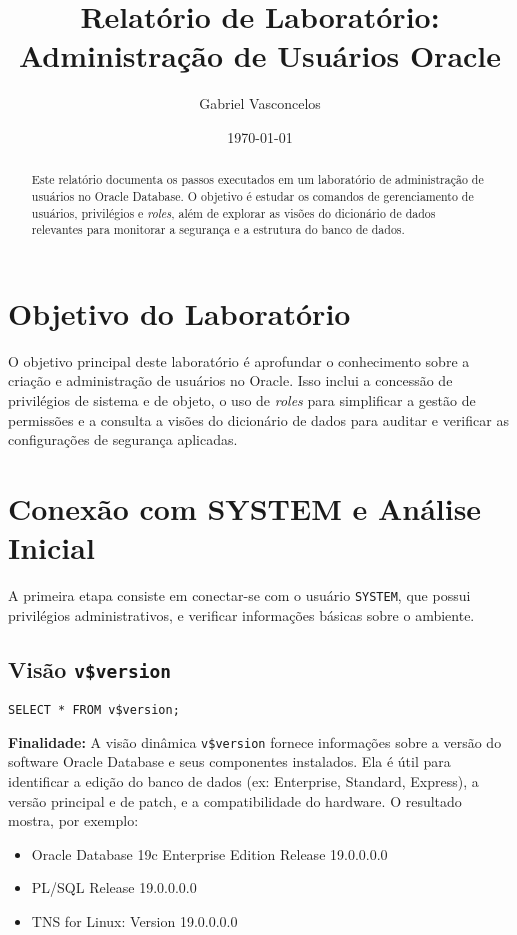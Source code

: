 \documentclass[a4paper, 12pt]{article}
\title{Relatório de Laboratório: Administração de Usuários Oracle}
\author{Gabriel Vasconcelos}
\date{\today}
\begin{document}
\maketitle

\begin{abstract}
Este relatório documenta os passos executados em um laboratório de administração de usuários no Oracle Database. O objetivo é estudar os comandos de gerenciamento de usuários, privilégios e \textit{roles}, além de explorar as visões do dicionário de dados relevantes para monitorar a segurança e a estrutura do banco de dados.
\end{abstract}

\tableofcontents
\newpage

\section{Objetivo do Laboratório}
O objetivo principal deste laboratório é aprofundar o conhecimento sobre a criação e administração de usuários no Oracle. Isso inclui a concessão de privilégios de sistema e de objeto, o uso de \textit{roles} para simplificar a gestão de permissões e a consulta a visões do dicionário de dados para auditar e verificar as configurações de segurança aplicadas.

\section{Conexão com SYSTEM e Análise Inicial}
A primeira etapa consiste em conectar-se com o usuário \texttt{SYSTEM}, que possui privilégios administrativos, e verificar informações básicas sobre o ambiente.

\subsection{Visão \texttt{v\$version}}
\begin{lstlisting}
SELECT * FROM v$version;
\end{lstlisting}
\textbf{Finalidade:} A visão dinâmica \texttt{v\$version} fornece informações sobre a versão do software Oracle Database e seus componentes instalados. Ela é útil para identificar a edição do banco de dados (ex: Enterprise, Standard, Express), a versão principal e de patch, e a compatibilidade do hardware. O resultado mostra, por exemplo:
\begin{itemize}
    \item Oracle Database 19c Enterprise Edition Release 19.0.0.0.0
    \item PL/SQL Release 19.0.0.0.0
    \item TNS for Linux: Version 19.0.0.0.0
\end{itemize}
\end{document}

